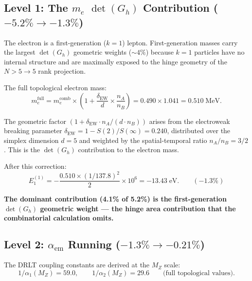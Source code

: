 \subsection{Level 1: The $m_e$ $\det(G_h)$ Contribution ($-5.2\% \to -1.3\%$)}

The electron is a first-generation ($k = 1$) lepton. First-generation masses carry the largest $\det(G_h)$ geometric weights ($\sim 4\%$) because $k = 1$ particles have no internal structure and are maximally exposed to the hinge geometry of the $N > 5 \to 5$ rank projection.

The full topological electron mass:
\begin{equation}
m_e^\text{full} = m_e^\text{comb} \times \left(1 + \frac{\delta_\text{EW}}{d} \times \frac{n_A}{n_B}\right) = 0.490 \times 1.041 = 0.510\;\text{MeV}.
\end{equation}

The geometric factor $(1 + \delta_\text{EW} \cdot n_A/(d \cdot n_B))$ arises from the electroweak breaking parameter $\delta_\text{EW} = 1 - S(2)/S(\infty) = 0.240$, distributed over the simplex dimension $d = 5$ and weighted by the spatial-temporal ratio $n_A/n_B = 3/2$. This is the $\det(G_h)$ contribution to the electron mass.

After this correction:
\begin{equation}
E_1^{(1)} = -\frac{0.510 \times (1/137.8)^2}{2} \times 10^6 = -13.43\;\text{eV}. \qquad (-1.3\%)
\end{equation}

\textbf{The dominant contribution (4.1\% of 5.2\%) is the first-generation $\det(G_h)$ geometric weight --- the hinge area contribution that the combinatorial calculation omits.}

\subsection{Level 2: $\alpha_\text{em}$ Running ($-1.3\% \to -0.21\%$)}

The DRLT coupling constants are derived at the $M_Z$ scale:
\begin{equation}
1/\alpha_1(M_Z) = 59.0, \qquad 1/\alpha_2(M_Z) = 29.6 \qquad \text{(full topological values)}.
\end{equation}

